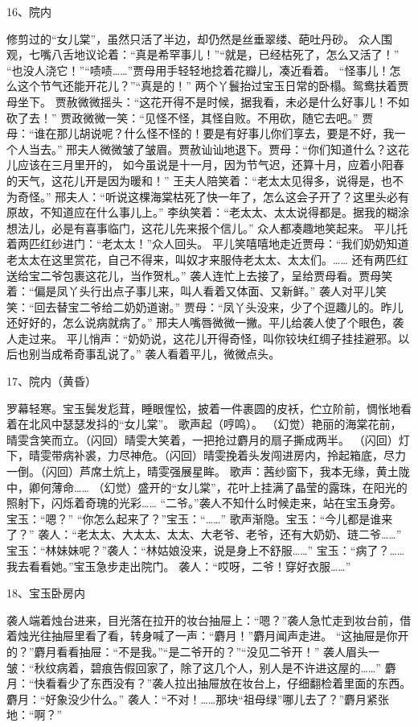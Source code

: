 16、院内\par
修剪过的“女儿棠”，虽然只活了半边，却仍然是丝垂翠缕、葩吐丹砂。
众人围观，七嘴八舌地议论着：“真是希罕事儿！”“就是，已经枯死了，怎么又活了！”
“也没人浇它！”“啧啧……”贾母用手轻轻地捻着花瓣儿，凑近看着。
“怪事儿！怎么这个节气还能开花儿？”“真是的！”
两个丫鬟抬过宝玉日常的卧榻。鸳鸯扶着贾母坐下。
贾赦微微摇头：“这花开得不是时候，据我看，未必是什么好事儿！不如砍了去！”
贾政微微一笑：“见怪不怪，其怪自败。不用砍，随它去吧。”
贾母：“谁在那儿胡说呢？什么怪不怪的！要是有好事儿你们享去，要是不好，我一个人当去。”
邢夫人微微皱了皱眉。贾赦讪讪地退下。贾母：“你们知道什么？这花儿应该在三月里开的，
如今虽说是十一月，因为节气迟，还算十月，应着小阳春的天气，这花儿开是因为暖和！”
王夫人陪笑着：“老太太见得多，说得是，也不为奇怪。”
邢夫人：“听说这棵海棠枯死了快一年了，怎么这会子开了？这里头必有原故，不知道应在什么事儿上。”
李纨笑着：“老太太、太太说得都是。据我的糊涂想法儿，必是有喜事临门，这花儿先来报个信儿。”
众人都凑趣地笑起来。
平儿托着两匹红纱进门：“老太太！”众人回头。
平儿笑嘻嘻地走近贾母：“我们奶奶知道老太太在这里赏花，自己不得来，叫奴才来服侍老太太、太太们。……
还有两匹红送给宝二爷包裹这花儿，当作贺札。”
袭人连忙上去接了，呈给贾母看。贾母笑着：“偏是凤丫头行出点子事儿来，叫人看着又体面、又新鲜。”
袭人对平儿笑笑：“回去替宝二爷给二奶奶道谢。”
贾母：“凤丫头没来，少了个逗趣儿的。昨儿还好好的，怎么说病就病了。”
邢夫人嘴唇微微一撇。平儿给袭人使了个眼色，袭人走过来。
平儿悄声：“奶奶说，这花儿开得奇怪，叫你铰块红绸子挂挂避邪。以后也别当成希奇事乱说了。”
袭人看着平儿，微微点头。

17、院内（黄昏）\par
罗幕轻寒。宝玉鬓发尨茸，睡眼惺忪，披着一件裹圆的皮袄，伫立阶前，惆怅地看着在北风中瑟瑟发抖的“女儿棠”。
歌声起（哼鸣）。
（幻觉）艳丽的海棠花前，晴雯含笑而立。（闪回）晴雯大笑着，一把抢过麝月的扇子撕成两半。
（闪回）灯下，晴雯带病补裘，力尽神危。（闪回）晴雯挽着头发闯进房内，拎起箱底，尽力一倒。（闪回）芦席土炕上，晴雯强展星眸。
歌声：茜纱窗下，我本无缘，黄土陇中，卿何薄命……
（幻觉）盛开的“女儿棠”，花叶上挂满了晶莹的露珠，在阳光的照射下，闪烁着奇瑰的光彩……
“二爷。”袭人不知什么时候走来，站在宝玉身旁。宝玉：“嗯？”
“你怎么起来了？”宝玉：“……”
歌声渐隐。宝玉：“今儿都是谁来了？”
袭人：“老太太、大太太、太太、大老爷、老爷，还有大奶奶、琏二爷……”
宝玉：“林妹妹呢？”袭人：“林姑娘没来，说是身上不舒服……”
宝玉：“病了？……我去看看她。”宝玉急步走出院门。
袭人：“哎呀，二爷！穿好衣服……”

18、宝玉卧房内\par
袭人端着烛台进来，目光落在拉开的妆台抽屉上：“嗯？”袭人急忙走到妆台前，借着烛光往抽屉里看了看，转身喊了一声：“麝月！”麝月闻声走进。
“这抽屉是你开的？”麝月看看抽屉：“不是我。”“是二爷开的？”“没见二爷开！”
袭人眉头一皱：“秋纹病着，碧痕告假回家了，除了这几个人，别人是不许进这屋的……”
麝月：“快看看少了东西没有？”袭人拉出抽屉放在妆台上，仔细翻检着里面的东西。麝月：“好象没少什么。”
袭人：“不对！……那块“祖母绿”哪儿去了？”麝月紧张地：“啊？”

